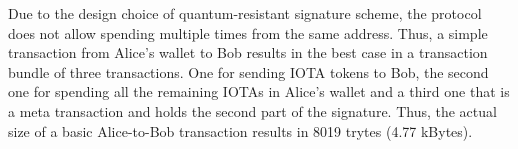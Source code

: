 Due to the design choice of quantum-resistant signature scheme, the protocol does not allow spending multiple times from the same address. Thus, a simple transaction from Alice's wallet to Bob results in the best case in a transaction bundle of three transactions. One for sending IOTA tokens to Bob, the second one for spending all the remaining IOTAs in Alice's wallet and a third one that is a meta transaction and holds the second part of the signature. Thus, the actual size of a basic Alice-to-Bob transaction results in 8019 trytes (4.77 kBytes).